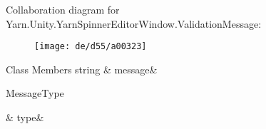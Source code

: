 Collaboration diagram for Yarn.\-Unity.\-Yarn\-Spinner\-Editor\-Window.\-Validation\-Message\-:
\nopagebreak
\begin{figure}[H]
\begin{center}
\leavevmode
\texttt{[image: de/d55/a00323]}
\end{center}
\end{figure}
\begin{DoxyFields}{Class Members}
\hypertarget{a00160_a636dce6708e779c201fa5e7d01cf2955}{string}\label{a00160_a636dce6708e779c201fa5e7d01cf2955}
&
message&
\\
\hline

\hypertarget{a00160_a7d342190c7657fbbe85eb6fa66bcabb8}{Message\-Type}\label{a00160_a7d342190c7657fbbe85eb6fa66bcabb8}
&
type&
\\
\hline

\end{DoxyFields}
